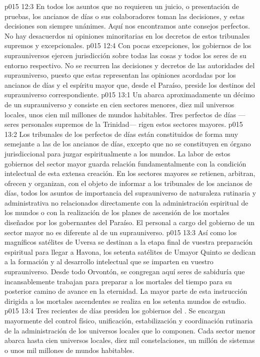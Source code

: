 \vs p015 12:3 En todos los asuntos que no requieren un juicio, o presentación de pruebas, los ancianos de días o sus colaboradores toman las decisiones, y estas decisiones son siempre unánimes. Aquí nos encontramos ante consejos perfectos. No hay desacuerdos ni opiniones minoritarias en los decretos de estos tribunales supremos y excepcionales.
\vs p015 12:4 Con pocas excepciones, los gobiernos de los suprauniversos ejercen jurisdicción sobre todas las cosas y todos los seres de su entorno respectivo. No se recurren las decisiones y decretos de las autoridades del suprauniverso, puesto que estas representan las opiniones acordadas por los ancianos de días y el espíritu mayor que, desde el Paraíso, preside los destinos del suprauniverso correspondiente.
\vs p015 13:1 Un  abarca aproximadamente un décimo de un suprauniverso y consiste en cien sectores menores, diez mil universos locales, unos cien mil millones de mundos habitables. Tres perfectos de días ---seres personales supremos de la Trinidad--- rigen estos sectores mayores.
\vs p015 13:2 Los tribunales de los perfectos de días están constituidos de forma muy semejante a las de los ancianos de días, excepto que no se constituyen en órgano jurisdiccional para juzgar espiritualmente a los mundos. La labor de estos gobiernos del sector mayor guarda relación fundamentalmente con la condición intelectual de esta extensa creación. En los sectores mayores se retienen, arbitran, ofrecen y organizan, con el objeto de informar a los tribunales de los ancianos de días, todos los asuntos de importancia del suprauniverso de naturaleza rutinaria y administrativa no relacionados directamente con la administración espiritual de los mundos o con la realización de los planes de ascensión de los mortales diseñados por los gobernantes del Paraíso. El personal a cargo del gobierno de un sector mayor no es diferente al de un suprauniverso.
\vs p015 13:3 Así como los magníficos satélites de Uversa se destinan a la etapa final de vuestra preparación espiritual para llegar a Havona, los setenta satélites de Umayor Quinto se dedican a la formación y al desarrollo intelectual que se imparten en vuestro suprauniverso. Desde todo Orvontón, se congregan aquí seres de sabiduría que incansablemente trabajan para preparar a los mortales del tiempo para su posterior camino de avance en la eternidad. La mayor parte de esta instrucción dirigida a los mortales ascendentes se realiza en los setenta mundos de estudio.
\vs p015 13:4 \pc Tres recientes de días presiden los gobiernos del . Se encargan mayormente del control físico, unificación, estabilización y coordinación rutinaria de la administración de los universos locales que lo componen. Cada sector menor abarca hasta cien universos locales, diez mil constelaciones, un millón de sistemas o unos mil millones de mundos habitables.
